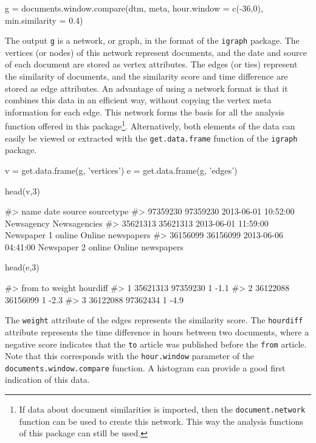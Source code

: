\begin{Schunk}
\begin{Sinput}
g = documents.window.compare(dtm, meta,
                             hour.window = c(-36,0), 
                             min.similarity = 0.4)
\end{Sinput}
\end{Schunk}

The output \texttt{g} is a network, or graph, in the format of the
\texttt{igraph} package. The vertices (or nodes) of this network
represent documents, and the date and source of each document are stored
as vertex attributes. The edges (or ties) represent the similarity of
documents, and the similarity score and time difference are stored as
edge attributes. An advantage of using a network format is that it
combines this data in an efficient way, without copying the vertex meta
information for each edge. This network forms the basis for all the
analysis function offered in this package\footnote{If data about
  document similarities is imported, then the \texttt{document.network}
  function can be used to create this network. This way the analysis
  functions of this package can still be used.}. Alternatively, both
elements of the data can easily be viewed or extracted with the
\texttt{get.data.frame} function of the \texttt{igraph} package.

\begin{Schunk}
\begin{Sinput}
v = get.data.frame(g, 'vertices')
e = get.data.frame(g, 'edges')

head(v,3)
\end{Sinput}
\begin{Soutput}
#>              name                date             source        sourcetype
#> 97359230 97359230 2013-06-01 10:52:00         Newsagency      Newsagencies
#> 35621313 35621313 2013-06-01 11:59:00 Newspaper 1 online Online newspapers
#> 36156099 36156099 2013-06-06 04:41:00 Newspaper 2 online Online newspapers
\end{Soutput}
\begin{Sinput}
head(e,3)                   
\end{Sinput}
\begin{Soutput}
#>       from       to weight hourdiff
#> 1 35621313 97359230      1     -1.1
#> 2 36122088 36156099      1     -2.3
#> 3 36122088 97362434      1     -4.9
\end{Soutput}
\end{Schunk}

The \texttt{weight} attribute of the edges represents the similarity
score. The \texttt{hourdiff} attribute represents the time difference in
hours between two documents, where a negative score indicates that the
\texttt{to} article was published before the \texttt{from} article. Note
that this corresponds with the \texttt{hour.window} parameter of the
\texttt{documents.window.compare} function. A histogram can provide a
good first indication of this data.

